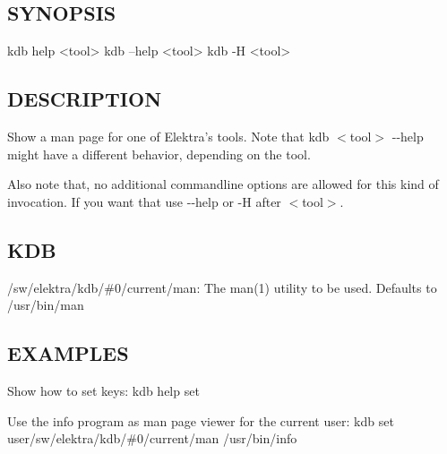 \subsection*{S\+Y\+N\+O\+P\+S\+IS}


\begin{DoxyCode}
kdb help <tool>
kdb --help <tool>
kdb -H <tool>
\end{DoxyCode}


\subsection*{D\+E\+S\+C\+R\+I\+P\+T\+I\+ON}

Show a man page for one of Elektra’s tools. Note that {\ttfamily kdb $<$tool$>$ -\/-\/help} might have a different behavior, depending on the tool.

Also note that, no additional commandline options are allowed for this kind of invocation. If you want that use {\ttfamily -\/-\/help} or {\ttfamily -\/H} after {\ttfamily $<$tool$>$}.

\subsection*{K\+DB}


\begin{DoxyItemize}
\item {\ttfamily /sw/elektra/kdb/\#0/current/man}\+: The man(1) utility to be used. Defaults to /usr/bin/man
\end{DoxyItemize}

\subsection*{E\+X\+A\+M\+P\+L\+ES}

Show how to set keys\+: {\ttfamily kdb help set}

Use the info program as man page viewer for the current user\+: {\ttfamily kdb set user/sw/elektra/kdb/\#0/current/man /usr/bin/info} 